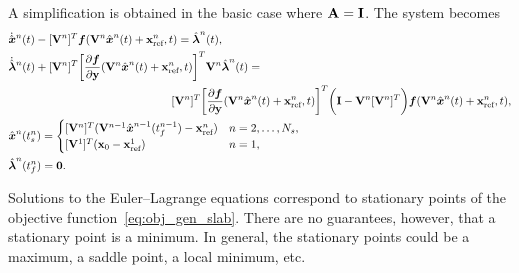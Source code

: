 A simplification is obtained in the basic case %
where $\mathbf{A} = \mathbf{I}$.
The system becomes
\begin{align*}\label{eq:lspg_continuous_simle} & \genstateDotArg{n}{t}  -
\basisspaceTArg{n}  \velocity(\veloargsromn) =  \adjointArg{n}{t} , \\
 &\adjointDotArg{n}{t}   + \basisspaceTArg{n} \bigg[\frac{\partial
\velocity}{\partial \stateyDiscrete}(\veloargsromn)\bigg]^T \basisspaceArg{n} \adjointArg{n}{t} = \\
&\hspace{2 in} \basisspaceTArg{n} \bigg[
\frac{\partial \velocity}{\partial \stateyDiscrete} (\veloargsromn) \bigg]^T \bigg( \mathbf{I} -   \basisspaceArg{n} \basisspaceTArg{n}
\bigg)    \velocity(\veloargsromn) , \\ & \genstateArg{n}{\timeStartArg{n}} =
\begin{cases} \basisspaceTArg{n}(\basisspaceArg{n-1}\genstateArg{n-1}{\timeEndArg{n-1}} - \stateInterceptArg{n})& n=2,\ldots,\nslabs, \\
\genstateICOne& n=1, \end{cases}\\
&\adjointArg{n}{\timeEndArg{n}} = \boldsymbol 0 .  \end{align*}
\begin{remark}
Solutions to the Euler--Lagrange equations correspond to stationary points 
of the objective function~\eqref{eq:obj_gen_slab}. There are no guarantees, 
however, that a stationary point is a minimum. In general, the stationary 
points could be a maximum, a saddle point, a local minimum, etc.
\end{remark}

